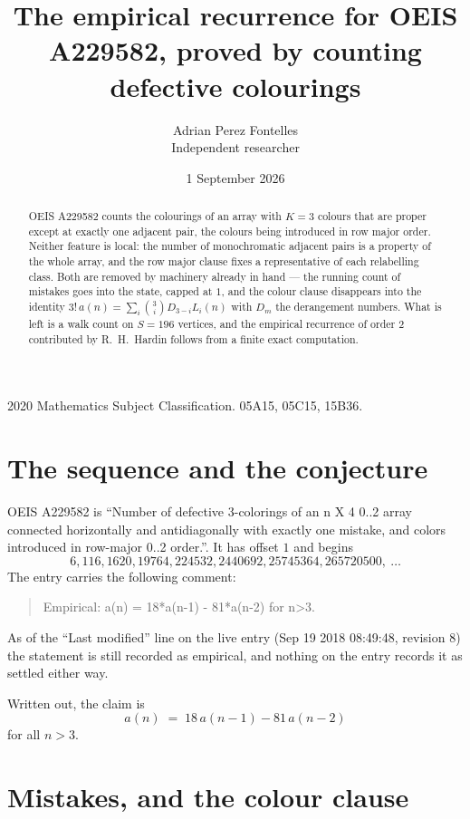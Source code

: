 \documentclass[11pt,a4paper]{article}
\title{The empirical recurrence for OEIS A229582, proved by counting defective colourings}
\author{Adrian Perez Fontelles\\ \small Independent researcher}
\date{1 September 2026}
\theoremstyle{plain}
\theoremstyle{definition}
\begin{document}
\maketitle

\begin{abstract}
OEIS A229582 counts the colourings of an array with $K=3$ colours that are proper except at
exactly one adjacent pair, the colours being introduced in row
major order. Neither feature is local: the number of monochromatic adjacent pairs is a
property of the whole array, and the row major clause fixes a representative of each
relabelling class. Both are removed by machinery already in hand --- the running count of
mistakes goes into the state, capped at $1$, and the colour clause disappears into the
identity $3!\,a(n)=\sum_i\binom{3}{i}D_{3-i}L_i(n)$ with $D_m$ the derangement
numbers. What is left is a walk count on $S=196$ vertices, and the empirical recurrence of
order $2$ contributed by R.~H.~Hardin follows from a finite exact computation.
\end{abstract}

\noindent\small 2020 Mathematics Subject Classification. 05A15, 05C15, 15B36.\normalsize

\section{The sequence and the conjecture}

OEIS A229582 is ``Number of defective 3-colorings of an n X 4 0..2 array connected horizontally and antidiagonally with exactly one mistake, and colors introduced in row-major 0..2 order.''. It has offset $1$ and begins
\[
6, 116, 1620, 19764, 224532, 2440692, 25745364, 265720500,\ \dots
\]
The entry carries the following comment:
\begin{quote}\small
Empirical: a(n) = 18*a(n-1) - 81*a(n-2) for n>3.
\end{quote}
As of the ``Last modified'' line on the live entry (Sep 19 2018 08:49:48, revision 8) the statement is
still recorded as empirical, and nothing on the entry records it as settled either way.

Written out, the claim is
\begin{equation}\label{eq:conj}
a(n)\;=\;18\,a(n-1) - 81\,a(n-2)
\end{equation}
for all $n>3$.

\section{Mistakes, and the colour clause}
\end{document}
